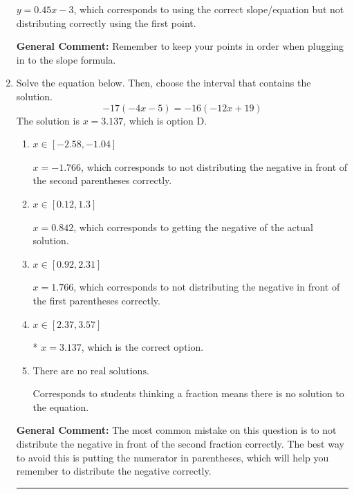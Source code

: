 \documentclass{extbook}[14pt]
\newcommand{\litem}[1]{\item #1

\rule{\textwidth}{0.4pt}}
\begin{document}
\begin{enumerate}
{\begin{enumerate}[label=\Alph*.]
 $y = 0.45x -3$, which corresponds to using the correct slope/equation but not distributing correctly using the first point.
\end{enumerate}

\textbf{General Comment:} Remember to keep your points in order when plugging in to the slope formula.
}
\litem{
Solve the equation below. Then, choose the interval that contains the solution.
\[ -17(-4x -5) = -16(-12x + 19) \]The solution is \( x = 3.137 \), which is option D.\begin{enumerate}[label=\Alph*.]
\item \( x \in [-2.58, -1.04] \)

$x = -1.766$, which corresponds to not distributing the negative in front of the second parentheses correctly.
\item \( x \in [0.12, 1.3] \)

$x = 0.842$, which corresponds to getting the negative of the actual solution.
\item \( x \in [0.92, 2.31] \)

$x = 1.766$, which corresponds to not distributing the negative in front of the first parentheses correctly.
\item \( x \in [2.37, 3.57] \)

* $x = 3.137$, which is the correct option.
\item \( \text{There are no real solutions.} \)

Corresponds to students thinking a fraction means there is no solution to the equation.
\end{enumerate}

\textbf{General Comment:} The most common mistake on this question is to not distribute the negative in front of the second fraction correctly. The best way to avoid this is putting the numerator in parentheses, which will help you remember to distribute the negative correctly.
}
\end{enumerate}
\end{document}
